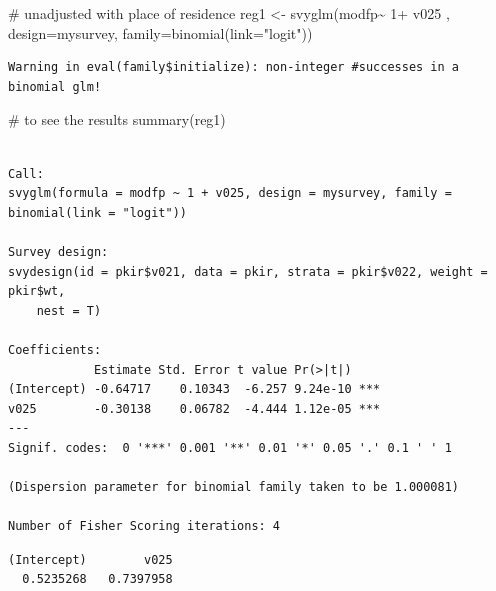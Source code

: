 \documentclass[
  letterpaper,
  DIV=11,
  numbers=noendperiod]{scrartcl}
\newenvironment{Shaded}{\begin{snugshade}}{\end{snugshade}}
\newcommand{\AttributeTok}[1]{\textcolor[rgb]{0.40,0.45,0.13}{#1}}
\newcommand{\CommentTok}[1]{\textcolor[rgb]{0.37,0.37,0.37}{#1}}
\newcommand{\DecValTok}[1]{\textcolor[rgb]{0.68,0.00,0.00}{#1}}
\newcommand{\FunctionTok}[1]{\textcolor[rgb]{0.28,0.35,0.67}{#1}}
\newcommand{\NormalTok}[1]{\textcolor[rgb]{0.00,0.23,0.31}{#1}}
\newcommand{\OtherTok}[1]{\textcolor[rgb]{0.00,0.23,0.31}{#1}}
\newcommand{\SpecialCharTok}[1]{\textcolor[rgb]{0.37,0.37,0.37}{#1}}
\newcommand{\StringTok}[1]{\textcolor[rgb]{0.13,0.47,0.30}{#1}}
\begin{document}
\begin{Shaded}
\begin{Highlighting}[]
\CommentTok{\# unadjusted with place of residence }
\NormalTok{reg1 }\OtherTok{\textless{}{-}} \FunctionTok{svyglm}\NormalTok{(modfp}\SpecialCharTok{\textasciitilde{}} \DecValTok{1}\SpecialCharTok{+}\NormalTok{ v025 , }\AttributeTok{design=}\NormalTok{mysurvey, }\AttributeTok{family=}\FunctionTok{binomial}\NormalTok{(}\AttributeTok{link=}\StringTok{"logit"}\NormalTok{))}
\end{Highlighting}
\end{Shaded}

\begin{verbatim}
Warning in eval(family$initialize): non-integer #successes in a binomial glm!
\end{verbatim}

\begin{Shaded}
\begin{Highlighting}[]
\CommentTok{\# to see the results}
\FunctionTok{summary}\NormalTok{(reg1)}
\end{Highlighting}
\end{Shaded}

\begin{verbatim}

Call:
svyglm(formula = modfp ~ 1 + v025, design = mysurvey, family = binomial(link = "logit"))

Survey design:
svydesign(id = pkir$v021, data = pkir, strata = pkir$v022, weight = pkir$wt, 
    nest = T)

Coefficients:
            Estimate Std. Error t value Pr(>|t|)    
(Intercept) -0.64717    0.10343  -6.257 9.24e-10 ***
v025        -0.30138    0.06782  -4.444 1.12e-05 ***
---
Signif. codes:  0 '***' 0.001 '**' 0.01 '*' 0.05 '.' 0.1 ' ' 1

(Dispersion parameter for binomial family taken to be 1.000081)

Number of Fisher Scoring iterations: 4
\end{verbatim}

\begin{Shaded}
\end{Shaded}

\begin{verbatim}
(Intercept)        v025 
  0.5235268   0.7397958 
\end{verbatim}
\end{document}
